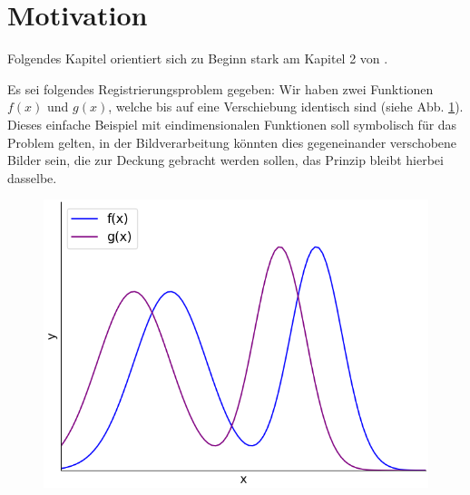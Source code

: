 %
%
%

\section{Motivation
\label{mellin:section:teil1}}

Folgendes Kapitel orientiert sich zu Beginn stark am Kapitel 2 von 
\cite{mellin:mendezmueller-book}.
\smallskip

Es sei folgendes Registrierungsproblem gegeben: Wir haben zwei Funktionen 
$f(x)$ und $g(x)$, welche bis auf eine Verschiebung identisch sind 
(siehe Abb. \ref{fig:mellin:f1}).
Dieses einfache Beispiel mit eindimensionalen Funktionen soll symbolisch 
für das Problem gelten, in der Bildverarbeitung könnten dies gegeneinander 
verschobene Bilder sein, die zur Deckung gebracht werden sollen, das 
Prinzip bleibt hierbei dasselbe.
\begin{figure}
    \centering
    \includegraphics[width=.5\textwidth]{papers/mellin/images/f1}
    \caption{}
    \label{fig:mellin:f1}
\end{figure}

